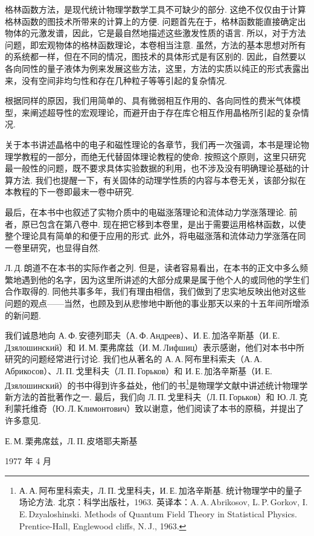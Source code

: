 格林函数方法，是现代统计物理学数学工具不可缺少的部分. 这绝不仅仅由于计算格林函数的图技术所带来的计算上的方便. 问题首先在于，格林函数能直接确定出物体的元激发谱，因此，它是最自然地描述这些激发性质的语言. 所以，对于方法问题，即宏观物体的格林函数理论，本卷相当注意. 虽然，方法的基本思想对所有的系统都一样，但在不同的情况，图技术的具体形式是有区别的. 因此，自然要以各向同性的量子液体为例来发展这些方法，这里，方法的实质以纯正的形式表露出来，没有空间非均匀性和存在几种粒子等等引起的复杂情况.

根据同样的原因，我们用简单的、具有微弱相互作用的、各向同性的费米气体模型，来阐述超导性的宏观理论，而避开由于存在库仑相互作用晶格所引起的复杂情况.

关于本书讲述晶格中的电子和磁性理论的各章节，我们再一次强调，本书是理论物理学教程的一部分，而绝无代替固体理论教程的使命. 按照这个原则，这里只研究最一般性的问题，既不要求具体实验数据的利用，也不涉及没有明确理论基础的计算方法. 我们也提醒一下，有关固体的动理学性质的内容与本卷无关，该部分拟在本教程的下一卷即最末一卷中研究.

最后，在本书中也叙述了实物介质中的电磁涨落理论和流体动力学涨落理论. 前者，原已包含在第八卷中. 现在把它移到本卷里，是出于需要运用格林函数，以使整个理论具有简单的和便于应用的形式. 此外，将电磁涨落和流体动力学涨落在同一卷里研究，也显得自然.

Л.\,Д.\,朗道不在本书的实际作者之列. 但是，读者容易看出，在本书的正文中多么频繁地遇到他的名字，因为这里所讲述的大部分成果是属于他个人的或同他的学生们合作取得的. 同他共事多年，我们有理由相信，我们做到了忠实地反映出他对这些问题的观点——当然，也顾及到从悲惨地中断他的事业那天以来的十五年间所增添的新问题.

我们诚恳地向 А.\,Ф.\,安德列耶夫（А.\,Ф.\,Андреев）、И.\,Е.\,加洛辛斯基（И.\,Е.\,Дзялошинский）和 И.\,М.\,栗弗席兹（И.\,М.\,Лифшиц）表示感谢，他们对本书中所研究的问题经常进行讨论. 我们也从著名的 А.\,А.\,阿布里科索夫（А.\,А.\,Абрикосов）、Л.\,П.\,戈里科夫（Л.\,П.\,Горьков）和 И.\,Е.\,加洛辛斯基（И.\,Е.\,Дзялошинский）的书中得到许多益处，他们的书\footnote{А.\,А.\,阿布里科索夫，Л.\,П.\,戈里科夫，И.\,Е.\,加洛辛斯基. 统计物理学中的量子场论方法. 北京：科学出版社，1963. 英译本：A.\,A.\,Abrikosov, L.\,P.\,Gorkov, I.\,E.\,Dzyaloshinski. Methods of Quantum Field Theory in Statistical Physics. Prentice-Hall, Englewood cliffs, N.\,J., 1963.}是物理学文献中讲述统计物理学新方法的首批著作之一. 最后，我们向 Л.\,П.\,戈里科夫（Л.\,П.\,Горьков）和 Ю.\,Л.\,克利蒙托维奇（Ю.\,Л.\,Климонтович）致以谢意，他们阅读了本书的原稿，并提出了许多意见.

\begin{flushright}
Е.\,М.\,栗弗席兹，Л.\,П.\,皮塔耶夫斯基

1977 年 4 月
\end{flushright}

